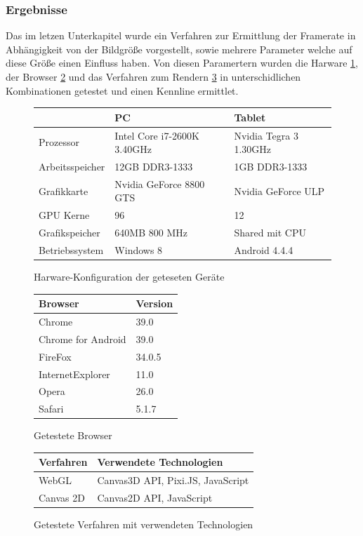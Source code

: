\subsubsection{Ergebnisse}
Das im letzen Unterkapitel wurde ein Verfahren zur Ermittlung der Framerate in Abhängigkeit von der Bildgröße vorgestellt, 
sowie mehrere Parameter welche auf diese Größe einen Einfluss haben.
Von diesen Paramertern wurden die Harware \ref{tab:tested_hardware}, 
der Browser \ref{tab:tested_browser} und das Verfahren zum Rendern \ref{tab:tested_technologies} in unterschidlichen Kombinationen getestet und einen Kennline ermittlet.
\begin{figure}[t]
	\centering
	\begin{tabular}{| l | l | l |}
		\hline
				& PC				& Tablet \\
		\hline
		Prozessor	& Intel Core i7-2600K 3.40GHz	& Nvidia Tegra 3 1.30GHz \\
		Arbeitsspeicher	& 12GB DDR3-1333		& 1GB DDR3-1333 \\
		Grafikkarte	& Nvidia GeForce 8800 GTS	& Nvidia GeForce ULP \\
		GPU Kerne	& 96				& 12 \\
		Grafikspeicher	& 640MB 800 MHz			& Shared mit CPU \\
		Betriebssystem	& Windows 8			& Android 4.4.4 \\
		\hline
	\end{tabular}
	\caption{Harware-Konfiguration der geteseten Geräte}
	\label{tab:tested_hardware}
\end{figure}
\begin{figure}[t]
	\centering
	\begin{tabular}{| l | l |}
		\hline
		Browser			& Version \\
		\hline
		Chrome			& 39.0 \\
		Chrome for Android 	& 39.0 \\
		FireFox			& 34.0.5 \\
		InternetExplorer	& 11.0 \\
		Opera			& 26.0 \\
		Safari			& 5.1.7 \\
		\hline
	\end{tabular}
	\caption{Getestete Browser}
	\label{tab:tested_browser}
\end{figure}
\begin{figure}[t]
	\centering
	\begin{tabular}{| l | l |}
		\hline
		Verfahren	& Verwendete Technologien \\
		\hline
		WebGL		& Canvas3D API, Pixi.JS, JavaScript \\
		Canvas 2D	& Canvas2D API, JavaScript \\
		\hline
	\end{tabular}
	\caption{Getestete Verfahren mit verwendeten Technologien}
	\label{tab:tested_technologies}
\end{figure}


